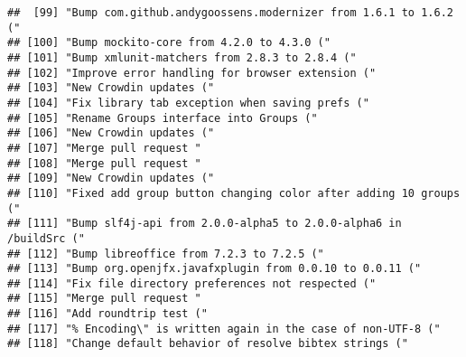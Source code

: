 \documentclass[
]{article}
\begin{document}
\begin{verbatim}
##  [99] "Bump com.github.andygoossens.modernizer from 1.6.1 to 1.6.2 ("                                                              
## [100] "Bump mockito-core from 4.2.0 to 4.3.0 ("                                                                                    
## [101] "Bump xmlunit-matchers from 2.8.3 to 2.8.4 ("                                                                                
## [102] "Improve error handling for browser extension ("                                                                             
## [103] "New Crowdin updates ("                                                                                                      
## [104] "Fix library tab exception when saving prefs ("                                                                              
## [105] "Rename Groups interface into Groups ("                                                                                      
## [106] "New Crowdin updates ("                                                                                                      
## [107] "Merge pull request "                                                                                                        
## [108] "Merge pull request "                                                                                                        
## [109] "New Crowdin updates ("                                                                                                      
## [110] "Fixed add group button changing color after adding 10 groups ("                                                             
## [111] "Bump slf4j-api from 2.0.0-alpha5 to 2.0.0-alpha6 in /buildSrc ("                                                            
## [112] "Bump libreoffice from 7.2.3 to 7.2.5 ("                                                                                     
## [113] "Bump org.openjfx.javafxplugin from 0.0.10 to 0.0.11 ("                                                                      
## [114] "Fix file directory preferences not respected ("                                                                             
## [115] "Merge pull request "                                                                                                        
## [116] "Add roundtrip test ("                                                                                                       
## [117] "% Encoding\" is written again in the case of non-UTF-8 ("                                                                   
## [118] "Change default behavior of resolve bibtex strings ("                                                                        

\end{verbatim}
\end{document}
